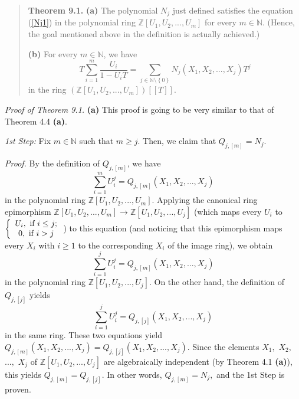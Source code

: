 \documentclass[numbers=enddot,12pt,final,onecolumn,notitlepage]{scrartcl}%
\begin{document}
\begin{quote}
\textbf{Theorem 9.1.} \textbf{(a)} The polynomial $N_{j}$ just defined
satisfies the equation (\ref{Nj1}) in the polynomial ring $\mathbb{Z}\left[
U_{1},U_{2},...,U_{m}\right]  $ for every $m\in\mathbb{N}$. (Hence, the goal
mentioned above in the definition is actually achieved.)

\textbf{(b)} For every $m\in\mathbb{N}$, we have%
\begin{equation}
T\sum_{i=1}^{m}\dfrac{U_{i}}{1-U_{i}T}=\sum_{j\in\mathbb{N}\setminus\left\{
0\right\}  }N_{j}\left(  X_{1},X_{2},...,X_{j}\right)  T^{j} \label{Nj2}%
\end{equation}
in the ring $\left(  \mathbb{Z}\left[  U_{1},U_{2},...,U_{m}\right]  \right)
\left[  \left[  T\right]  \right]  $.
\end{quote}

\textit{Proof of Theorem 9.1.} \textbf{(a)} This proof is going to be very
similar to that of Theorem 4.4 \textbf{(a)}.

\textit{1st Step:} Fix $m\in\mathbb{N}$ such that $m\geq j$. Then, we claim
that $Q_{j,\left[  m\right]  }=N_{j}$.

\textit{Proof.} By the definition of $Q_{j,\left[  m\right]  }$, we have%
\[
\sum_{i=1}^{m}U_{i}^{j}=Q_{j,\left[  m\right]  }\left(  X_{1},X_{2}%
,...,X_{j}\right)
\]
in the polynomial ring $\mathbb{Z}\left[  U_{1},U_{2},...,U_{m}\right]  $.
Applying the canonical ring epimorphism $\mathbb{Z}\left[  U_{1}%
,U_{2},...,U_{m}\right]  \rightarrow\mathbb{Z}\left[  U_{1},U_{2}%
,...,U_{j}\right]  $ (which maps every $U_{i}$ to $\left\{
\begin{array}
[c]{c}%
U_{i},\text{ if }i\leq j;\\
0,\text{ if }i>j
\end{array}
\right.  $) to this equation (and noticing that this epimorphism maps every
$X_{i}$ with $i\geq1$ to the corresponding $X_{i}$ of the image ring), we
obtain%
\[
\sum_{i=1}^{j}U_{i}^{j}=Q_{j,\left[  m\right]  }\left(  X_{1},X_{2}%
,...,X_{j}\right)
\]
in the polynomial ring $\mathbb{Z}\left[  U_{1},U_{2},...,U_{j}\right]  $. On
the other hand, the definition of $Q_{j,\left[  j\right]  }$ yields%
\[
\sum_{i=1}^{j}U_{i}^{j}=Q_{j,\left[  j\right]  }\left(  X_{1},X_{2}%
,...,X_{j}\right)
\]
in the same ring. These two equations yield $Q_{j,\left[  m\right]  }\left(
X_{1},X_{2},...,X_{j}\right)  =Q_{j,\left[  j\right]  }\left(  X_{1}%
,X_{2},...,X_{j}\right)  $. Since the elements $X_{1},$ $X_{2},$ $...,$
$X_{j}$ of $\mathbb{Z}\left[  U_{1},U_{2},...,U_{j}\right]  $ are
algebraically independent (by Theorem 4.1 \textbf{(a)}), this yields
$Q_{j,\left[  m\right]  }=Q_{j,\left[  j\right]  }.$ In other words,
$Q_{j,\left[  m\right]  }=N_{j},$ and the 1st Step is proven.
\end{document}
